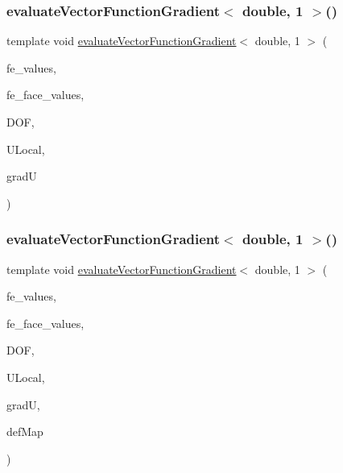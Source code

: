 \mbox{\label{function_evaluations_8cc_ac57e06f570eda3571e00912325612971}} 
\subsubsection{\texorpdfstring{evaluateVectorFunctionGradient$<$ double, 1 $>$()}{evaluateVectorFunctionGradient< double, 1 >()}\hspace{0.1cm}{\footnotesize\ttfamily [3/4]}}
{\footnotesize\ttfamily template void \mbox{\hyperlink{group___evaluation_functions_ga9608539d601a91aff1ba01ccc720fbe0}{evaluate\+Vector\+Function\+Gradient}}$<$ double, 1 $>$ (\begin{DoxyParamCaption}\item[{const F\+E\+Values$<$ 1 $>$ \&}]{fe\+\_\+values,  }\item[{const F\+E\+Face\+Values$<$ 1 $>$ \&}]{fe\+\_\+face\+\_\+values,  }\item[{unsigned int}]{D\+OF,  }\item[{Table$<$ 1, double $>$ \&}]{U\+Local,  }\item[{Table$<$ 3, double $>$ \&}]{gradU }\end{DoxyParamCaption})}

\mbox{\label{function_evaluations_8cc_a20af37a91c353a81f4d9ad3b2dd678af}} 
\subsubsection{\texorpdfstring{evaluateVectorFunctionGradient$<$ double, 1 $>$()}{evaluateVectorFunctionGradient< double, 1 >()}\hspace{0.1cm}{\footnotesize\ttfamily [4/4]}}
{\footnotesize\ttfamily template void \mbox{\hyperlink{group___evaluation_functions_ga9608539d601a91aff1ba01ccc720fbe0}{evaluate\+Vector\+Function\+Gradient}}$<$ double, 1 $>$ (\begin{DoxyParamCaption}\item[{const F\+E\+Values$<$ 1 $>$ \&}]{fe\+\_\+values,  }\item[{const F\+E\+Face\+Values$<$ 1 $>$ \&}]{fe\+\_\+face\+\_\+values,  }\item[{unsigned int}]{D\+OF,  }\item[{Table$<$ 1, double $>$ \&}]{U\+Local,  }\item[{Table$<$ 3, double $>$ \&}]{gradU,  }\item[{\mbox{\hyperlink{structdeformation_map}{deformation\+Map}}$<$ double, 1 $>$ \&}]{def\+Map }\end{DoxyParamCaption})}

